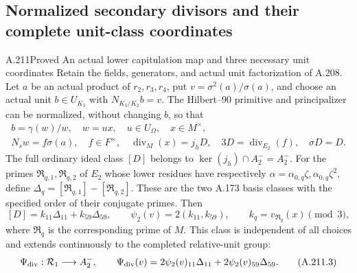 \subsection{Normalized secondary divisors and their complete unit-class coordinates}

\begin{statement}{A.211}{Proved}
{An actual lower capitulation map and three necessary unit coordinates}
Retain the fields, generators, and actual unit factorization of A.208.
Let \(a\) be an actual product of \(r_2,r_3,r_4\), put
\(v=\sigma^2(a)/\sigma(a)\), and choose an actual unit
\(b\in U_{K_3}\) with \(N_{K_3/K_2}b=v\).
The Hilbert--90 primitive and principalizer can be normalized,
without changing \(b\), so that
\[
\begin{gathered}
 b=\gamma(w)/w,\quad w=ux,\quad u\in U_\Omega,\quad x\in M^\times,\\
 N_sw=f\sigma(a),\quad f\in F^\times,\quad
 \operatorname{div}_M(x)=j_hD,\quad
 3D=\operatorname{div}_{E_2}(f),\quad \sigma D=D.
\end{gathered}
\tag{A.211.1}
\]
The full ordinary ideal class \([D]\) belongs to
\(\ker(j_h)\cap A_2^-=A_2^-\).
For the primes \(\mathfrak R_{q,1},\mathfrak R_{q,2}\)
of \(E_2\) whose lower residues have respectively
\(\alpha=\alpha_{0,q}\zeta,\alpha_{0,q}\zeta^2\), define
\(\Delta_q=[\mathfrak R_{q,1}]-[\mathfrak R_{q,2}]\).
These are the two A.173 basis classes with the specified order
of their conjugate primes.  Then
\[
 [D]=k_{11}\Delta_{11}+k_{59}\Delta_{59},\qquad
 \psi_2(v)=2(k_{11},k_{59}),\qquad
 k_q=v_{\mathfrak R_q}(x)\pmod3,
\tag{A.211.2}
\]
where \(\mathfrak R_q\) is the corresponding prime of \(M\).
This class is independent of all choices and extends continuously
to the completed relative-unit group:
\[
 \Psi_{\rm div}:\mathcal R_1\longrightarrow A_2^-,
 \qquad
 \Psi_{\rm div}(v)=
 2\psi_2(v)_{11}\Delta_{11}+2\psi_2(v)_{59}\Delta_{59}.
\tag{A.211.3}
\]


\end{statement}

